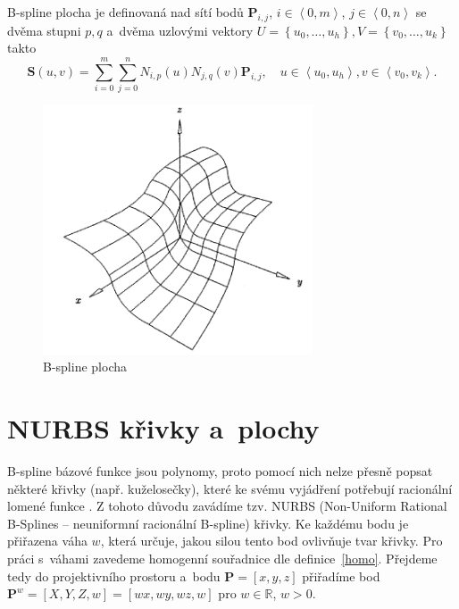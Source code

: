 \begin{definice}
	B-spline plocha je definovaná nad sítí bodů $\mathbf{P}_{i,j}$, $i\in\left\langle0,m\right\rangle$, $j\in\left\langle 0,n\right\rangle$ se dvěma stupni $p,q$ a~dvěma uzlovými vektory $U=\left\lbrace u_0,\dots,u_h \right\rbrace,V=\left\lbrace v_0,\dots,u_k \right\rbrace$ takto
	\begin{equation}
		\mathbf{S}\left(u,v\right)=\sum _{i=0}^{m}\sum _{j=0}^{n}{N}_{i,p}\left(u\right){N}_{j,q}\left(v\right)\mathbf{P}_{i,j}, \quad u \in \left\langle u_0,u_h \right\rangle,v \in \left\langle v_0,v_k \right\rangle.
	\end{equation}
\end{definice}

\begin{figure}[!h]
	\begin{center}
		\includegraphics*[width=8cm]{obr/plocha}
	\end{center}
	\caption{B-spline plocha \cite{Pieglc1997}}
	\label{obrPlocha}
\end{figure}

\section{NURBS křivky a~plochy}\label{cast23}
B-spline bázové funkce jsou polynomy, proto pomocí nich nelze přesně popsat některé křivky (např. kuželosečky), které ke svému vyjádření potřebují racionální lomené funkce \cite{Pieglc1997,Shenec19972014}. Z tohoto důvodu zavádíme tzv. NURBS (Non-Uniform Rational B-Splines -- neuniformní racionální B-spline) křivky. Ke každému bodu je přiřazena váha $w$, která určuje, jakou silou tento bod ovlivňuje tvar křivky. Pro práci s~váhami zavedeme homogenní souřadnice dle definice~\ref{homo}. Přejdeme tedy do projektivního prostoru a~bodu $\mathbf{P}=\left[x,y,z\right]$ přiřadíme bod $\mathbf{P}^w=\left[X,Y,Z,w\right]=\left[wx,wy,wz,w\right]$ pro $w\in\mathbb{R}$, $w>0$.

